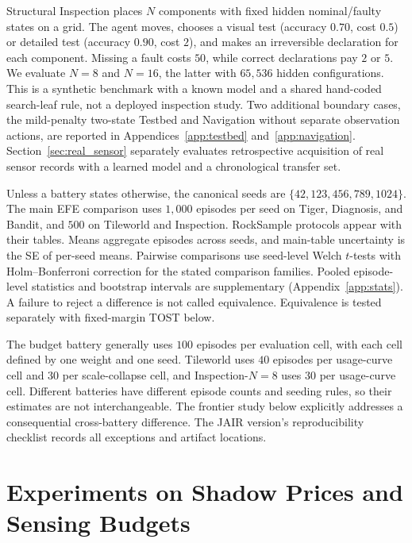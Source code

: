 \documentclass[runningheads]{llncs}
\begin{document}
Structural Inspection places $N$ components with fixed hidden nominal/faulty states on a grid. The agent moves, chooses a visual test (accuracy $0.70$, cost $0.5$) or detailed test (accuracy $0.90$, cost $2$), and makes an irreversible declaration for each component. Missing a fault costs $50$, while correct declarations pay $2$ or $5$. We evaluate $N{=}8$ and $N{=}16$, the latter with $65{,}536$ hidden configurations. This is a synthetic benchmark with a known model and a shared hand-coded search-leaf rule, not a deployed inspection study. Two additional boundary cases, the mild-penalty two-state Testbed and Navigation without separate observation actions, are reported in Appendices~\ref{app:testbed} and~\ref{app:navigation}. Section~\ref{sec:real_sensor} separately evaluates retrospective acquisition of real sensor records with a learned model and a chronological transfer set.

Unless a battery states otherwise, the canonical seeds are $\{42,\allowbreak 123,\allowbreak 456,\allowbreak 789,\allowbreak 1024\}$. The main EFE comparison uses $1{,}000$ episodes per seed on Tiger, Diagnosis, and Bandit, and $500$ on Tileworld and Inspection. RockSample protocols appear with their tables. Means aggregate episodes across seeds, and main-table uncertainty is the SE of per-seed means. Pairwise comparisons use seed-level Welch $t$-tests with Holm--Bonferroni correction for the stated comparison families. Pooled episode-level statistics and bootstrap intervals are supplementary (Appendix~\ref{app:stats}). A failure to reject a difference is not called equivalence. Equivalence is tested separately with fixed-margin TOST below.

The budget battery generally uses $100$ episodes per evaluation cell, with each cell defined by one weight and one seed. Tileworld uses $40$ episodes per usage-curve cell and $30$ per scale-collapse cell, and Inspection-$N{=}8$ uses $30$ per usage-curve cell. Different batteries have different episode counts and seeding rules, so their estimates are not interchangeable. The frontier study below explicitly addresses a consequential cross-battery difference. The JAIR version's reproducibility checklist records all exceptions and artifact locations.

\section{Experiments on Shadow Prices and Sensing Budgets}
\label{sec:budget_experiments}
\end{document}
